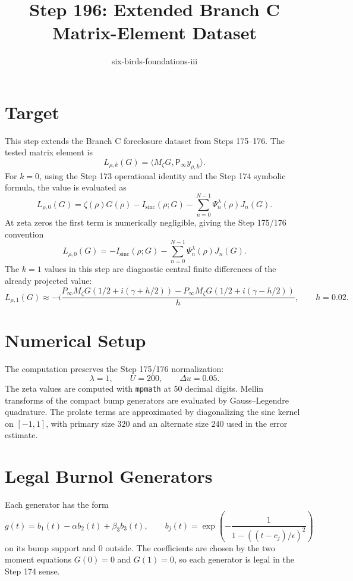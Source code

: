 \documentclass[11pt]{article}
\title{Step 196: Extended Branch C Matrix-Element Dataset}
\author{six-birds-foundations-iii}
\date{}
\begin{document}
\maketitle

\section*{Target}

This step extends the Branch C foreclosure dataset from Steps 175--176.  The tested matrix element is
\[
  L_{\rho,k}(G)=\langle M_\zeta G,\mathsf P_\infty y_{\rho,k}\rangle.
\]
For \(k=0\), using the Step 173 operational identity and the Step 174 symbolic formula, the value is evaluated as
\[
  L_{\rho,0}(G)
   =
   \zeta(\rho)G(\rho)-I_{\mathrm{sinc}}(\rho;G)
   -\sum_{n=0}^{N-1}\Psi_n^\lambda(\rho)J_n(G).
\]
At zeta zeros the first term is numerically negligible, giving the Step 175/176 convention
\[
  L_{\rho,0}(G)
   =
   -I_{\mathrm{sinc}}(\rho;G)
   -\sum_{n=0}^{N-1}\Psi_n^\lambda(\rho)J_n(G).
\]
The \(k=1\) values in this step are diagnostic central finite differences of the already projected value:
\[
  L_{\rho,1}(G)
   \approx
   -i\frac{P_{\infty}M_\zeta G(1/2+i(\gamma+h/2))
           -P_{\infty}M_\zeta G(1/2+i(\gamma-h/2))}{h},
   \qquad h=0.02.
\]

\section*{Numerical Setup}

The computation preserves the Step 175/176 normalization:
\[
  \lambda=1,\qquad U=200,\qquad \Delta u=0.05.
\]
The zeta values are computed with \texttt{mpmath} at 50 decimal digits.  Mellin transforms of the compact bump generators are evaluated by Gauss--Legendre quadrature.  The prolate terms are approximated by diagonalizing the sinc kernel on \([-1,1]\), with primary size \(320\) and an alternate size \(240\) used in the error estimate.

\section*{Legal Burnol Generators}

Each generator has the form
\[
  g(t)=b_1(t)-\alpha b_2(t)+\beta_3 b_3(t),\qquad
  b_j(t)=\exp\!\left(-\frac{1}{1-((t-c_j)/\epsilon)^2}\right)
\]
on its bump support and \(0\) outside.  The coefficients are chosen by the two moment equations \(G(0)=0\) and \(G(1)=0\), so each generator is legal in the Step 174 sense.
\end{document}
